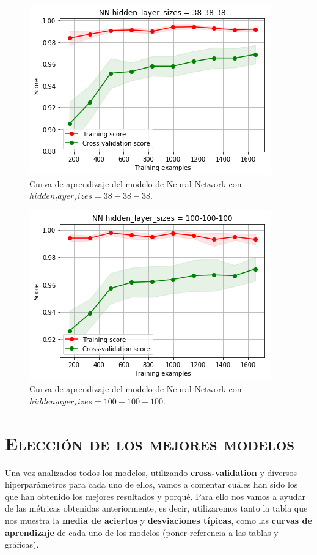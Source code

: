 \documentclass[11pt,a4paper]{article}
\begin{document}
\begin{figure}[H]
    \centering
    \includegraphics[scale=0.7]{img/lc-nn-38-38-38.png}
    \caption{Curva de aprendizaje del modelo de Neural Network con $hidden_layer_sizes=38-38-38$.}
    \label{fig:lc-nn-38-38-38}
\end{figure}

\begin{figure}[H]
    \centering
    \includegraphics[scale=0.7]{img/lc-nn-100-100-100.png}
    \caption{Curva de aprendizaje del modelo de Neural Network con $hidden_layer_sizes=100-100-100$.}
    \label{fig:lc-nn-100-100-100}
\end{figure}

\newpage

\section{\textsc{Elección de los mejores modelos}}

Una vez analizados todos los modelos, utilizando \textbf{cross-validation} y diversos hiperparámetros para cada uno de ellos, vamos a
comentar cuáles han sido los que han obtenido los mejores resultados y porqué. Para ello nos vamos a ayudar de las métricas obtenidas
anteriormente, es decir, utilizaremos tanto la tabla que nos muestra la \textbf{media de aciertos} y \textbf{desviaciones típicas}, como
las \textbf{curvas de aprendizaje} de cada uno de los modelos (poner referencia a las tablas y gráficas).
\end{document}

